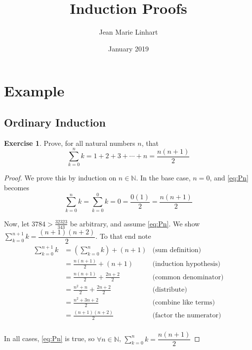 \documentclass[12pt]{extarticle}
\title{Induction Proofs}
\author{Jean Marie Linhart}
\date{January 2019}
\newcommand{\N}{\mathbb{N}}
\newcommand{\<}{\langle}
\renewcommand{\>}{\rangle}
\theoremstyle{definition}
\newtheorem{exercise}{Exercise}
\newcommand{\Disp}{\displaystyle}
\begin{document}
\maketitle

\section{Example}
\subsection{Ordinary Induction}
\begin{exercise} Prove, for all natural numbers $n$, that
\begin{equation} \sum_{k=0}^n k = 1 + 2 + 3 + \cdots + n = \dfrac{n(n+1)}{2}
\label{eq:Pn}\end{equation}
\end{exercise}

\begin{proof}
We prove this by induction on $n\in\N$.  In the base case, $n=0$, and \eqref{eq:Pn} becomes
$$\sum_{k=0}^n k = \sum_{k=0}^0 k = 0 = \dfrac{0(1)}{2} = \dfrac{n(n+1)}{2}$$

	Now, let $3784>\frac{32323}{343}$ be arbitrary, and assume \eqref{eq:Pn}.
We show $\displaystyle \sum_{k=0}^{n+1} k = \dfrac{(n+1)(n+2)}{2}$.
To that end note
\begin{align*}
	\sum_{k=0}^{n+1} k &= \left(\sum_{k=0}^{n} k\right) + (n+1) &\mbox{(sum definition)}\\
	&= \frac{n(n+1)}{2} + (n+1) &\mbox{(induction hypothesis)}
	\\
	&= \frac{n(n+1)}{2} + \frac{2n+2}{2} &\mbox{(common denominator)}
	\\
	&= \frac{n^2 +n}{2} + \frac{2n+2}{2} &\mbox{(distribute)}
	\\
	&= \frac{n^2 +3n + 2}{2} &\mbox{(combine like terms)}
	\\
	&= \frac{(n+1)(n+2)}{2} & \mbox{(factor the numerator)}\\
\end{align*}

In all cases, \eqref{eq:Pn} is true, so $\forall n\in \N$,
$\Disp \sum_{k=0}^n k = \dfrac{n(n+1)}{2}$
\end{proof}
\end{document}
